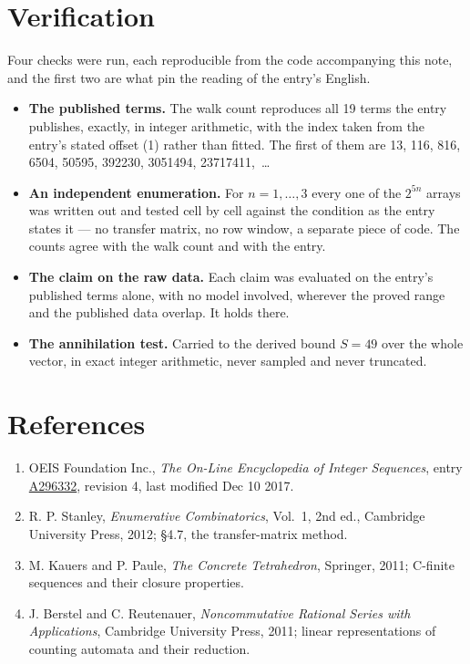 \documentclass[11pt]{article}
\theoremstyle{definition}
\begin{document}
\section{Verification}

Four checks were run, each reproducible from the code accompanying this note, and the first two are what pin the reading of the entry's English.

\begin{itemize}

\item {\bfseries The published terms.} The walk count reproduces all 19 terms the entry publishes, exactly, in integer arithmetic, with the index taken from the entry's stated offset (1) rather than fitted. The first of them are 13, 116, 816, 6504, 50595, 392230, 3051494, 23717411,~\dots

\item {\bfseries An independent enumeration.} For $n = 1,\dots,3$ every one of the $2^{5n}$ arrays was written out and tested cell by cell against the condition as the entry states it --- no transfer matrix, no row window, a separate piece of code. The counts agree with the walk count and with the entry.

\item {\bfseries The claim on the raw data.} Each claim was evaluated on the entry's published terms alone, with no model involved, wherever the proved range and the published data overlap. It holds there.

\item {\bfseries The annihilation test.} Carried to the derived bound $S = 49$ over the whole vector, in exact integer arithmetic, never sampled and never truncated.

\end{itemize}

\section{References}

\begin{enumerate}

\item OEIS Foundation Inc., \emph{The On-Line Encyclopedia of Integer Sequences}, entry \href{https://oeis.org/A296332}{A296332}, revision 4, last modified Dec 10 2017.

\item R. P. Stanley, \emph{Enumerative Combinatorics}, Vol.~1, 2nd ed., Cambridge University Press, 2012; \S4.7, the transfer-matrix method.

\item M. Kauers and P. Paule, \emph{The Concrete Tetrahedron}, Springer, 2011; C-finite sequences and their closure properties.

\item J. Berstel and C. Reutenauer, \emph{Noncommutative Rational Series with Applications}, Cambridge University Press, 2011; linear representations of counting automata and their reduction.

\end{enumerate}
\end{document}
